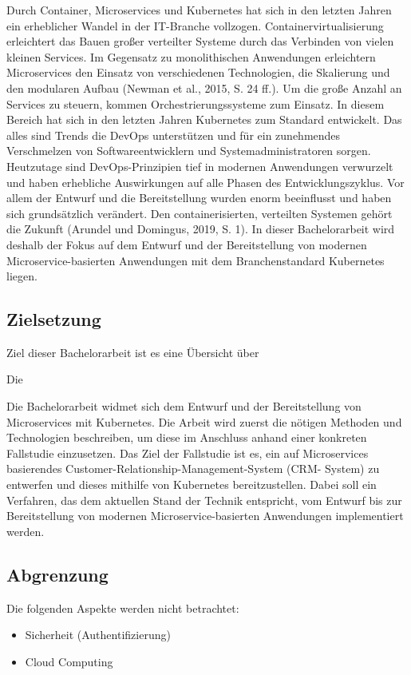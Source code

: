 Durch Container, Microservices und Kubernetes hat sich in den letzten Jahren ein erheblicher
Wandel in der IT-Branche vollzogen. Containervirtualisierung erleichtert das Bauen großer
verteilter Systeme durch das Verbinden von vielen kleinen Services. Im Gegensatz zu
monolithischen Anwendungen erleichtern Microservices den Einsatz von verschiedenen
Technologien, die Skalierung und den modularen Aufbau (Newman et al., 2015, S. 24 ff.).
Um die große Anzahl an Services zu steuern, kommen Orchestrierungssysteme zum Einsatz.
In diesem Bereich hat sich in den letzten Jahren Kubernetes zum Standard entwickelt. Das
alles sind Trends die DevOps unterstützen und für ein zunehmendes Verschmelzen von
Softwareentwicklern und Systemadministratoren sorgen. Heutzutage sind DevOps-Prinzipien
tief in modernen Anwendungen verwurzelt und haben erhebliche Auswirkungen auf alle
Phasen des Entwicklungszyklus. Vor allem der Entwurf und die Bereitstellung wurden enorm
beeinflusst und haben sich grundsätzlich verändert. Den containerisierten, verteilten Systemen
gehört die Zukunft (Arundel und Domingus, 2019, S. 1). In dieser Bachelorarbeit wird deshalb
der Fokus auf dem Entwurf und der Bereitstellung von modernen Microservice-basierten
Anwendungen mit dem Branchenstandard Kubernetes liegen.


\subsection{Zielsetzung}
Ziel dieser Bachelorarbeit ist es eine Übersicht über 

Die 


Die Bachelorarbeit widmet sich dem Entwurf und der Bereitstellung von Microservices mit
Kubernetes. Die Arbeit wird zuerst die nötigen Methoden und Technologien beschreiben, um
diese im Anschluss anhand einer konkreten Fallstudie einzusetzen. Das Ziel der Fallstudie
ist es, ein auf Microservices basierendes Customer-Relationship-Management-System (CRM-
System) zu entwerfen und dieses mithilfe von Kubernetes bereitzustellen. Dabei soll ein
Verfahren, das dem aktuellen Stand der Technik entspricht, vom Entwurf bis zur Bereitstellung
von modernen Microservice-basierten Anwendungen implementiert werden.

\subsection{Abgrenzung}
Die folgenden Aspekte werden nicht betrachtet:
\begin{itemize}
\item Sicherheit (Authentifizierung)
\item Cloud Computing
\end{itemize}
